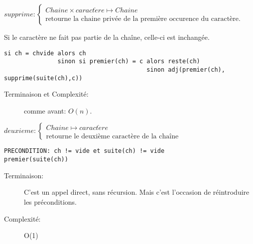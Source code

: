 \documentclass[10pt]{article}\usepackage[correction,nu]{esial}
\begin{document}
\begin{Question}
  $supprime: \left\{
    \begin{array}{l}
      Chaine\times caract\grave{e}re\mapsto Chaine\\
      \text{retourne la chaine privée de la première occurence du caractère.}
    \end{array}\right.$  

  Si le caractère ne fait pas partie de la chaîne, celle-ci est inchangée.
\end{Question}
\begin{Reponse}
  \begin{Verbatim}[label=supprime(ch\quotesinglbase c)]
si ch = chvide alors ch
               sinon si premier(ch) = c alors reste(ch)
                                        sinon adj(premier(ch), supprime(suite(ch),c))
  \end{Verbatim}
  \begin{description}
  \item[Terminaison et Complexité:] comme avant: $O(n)$. 
  \end{description}
\end{Reponse}

\begin{Question}
  $deuxieme: \left\{
    \begin{array}{l}
      Chaine\mapsto caract\grave{e}re\\
      \text{retourne le deuxième caractère de la chaîne}
    \end{array}\right.$  
\end{Question}
\begin{Reponse}
  \begin{Verbatim}[label=deuxieme(ch)]
PRECONDITION: ch != vide et suite(ch) != vide
premier(suite(ch))
  \end{Verbatim}
  \begin{description}
  \item[Terminaison:] C'est un appel direct, sans récursion. Mais c'est
    l'occasion de réintroduire les préconditions.
  \item[Complexité:] O(1)
  \end{description}
\end{Reponse}
\end{document}
